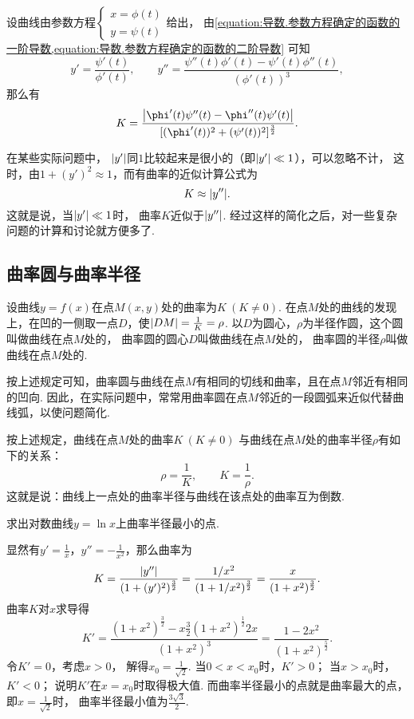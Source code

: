 设曲线由参数方程\(\left\{ \begin{array}{c}
	x = \phi(t) \\
	y = \psi(t)
\end{array} \right.\)给出，
由\cref{equation:导数.参数方程确定的函数的一阶导数,equation:导数.参数方程确定的函数的二阶导数}
可知\[
	y' = \frac{\psi'(t)}{\phi'(t)}, \qquad
	y'' = \frac{\psi''(t) \phi'(t) - \psi'(t) \phi''(t)}{(\phi'(t))^3},
\]
那么有\begin{equation}
	K = \frac{
		\abs{\phi'(t)\psi''(t)-\phi''(t)\psi'(t)}
	}{
		[(\phi'(t))^2+(\psi'(t))^2]^{\frac32}
	}.
\end{equation}

在某些实际问题中，
\(\abs{y'}\)同\(1\)比较起来是很小的（即\(\abs{y'} \ll 1\)），可以忽略不计，
这时，由\(1 + (y')^2 \approx 1\)，而有曲率的近似计算公式为\[
	K \approx \abs{y''}.
\]
这就是说，当\(\abs{y'} \ll 1\)时，
曲率\(K\)近似于\(\abs{y''}\).
经过这样的简化之后，对一些复杂问题的计算和讨论就方便多了.

\subsection{曲率圆与曲率半径}
设曲线\(y=f(x)\)在点\(M(x,y)\)处的曲率为\(K\ (K\neq0)\).
在点\(M\)处的曲线的发现上，在凹的一侧取一点\(D\)，使\(\abs{DM} = \frac{1}{K} = \rho\).
以\(D\)为圆心，\(\rho\)为半径作圆，这个圆叫做曲线在点\(M\)处的，
曲率圆的圆心\(D\)叫做曲线在点\(M\)处的，
曲率圆的半径\(\rho\)叫做曲线在点\(M\)处的.

按上述规定可知，曲率圆与曲线在点\(M\)有相同的切线和曲率，且在点\(M\)邻近有相同的凹向.
因此，在实际问题中，常常用曲率圆在点\(M\)邻近的一段圆弧来近似代替曲线弧，以使问题简化.

按上述规定，曲线在点\(M\)处的曲率\(K\ (K\neq0)\)
与曲线在点\(M\)处的曲率半径\(\rho\)有如下的关系：\[
	\rho = \frac{1}{K}, \qquad
	K = \frac{1}{\rho}.
\]
这就是说：曲线上一点处的曲率半径与曲线在该点处的曲率互为倒数.

\begin{example}
求出对数曲线\(y = \ln x\)上曲率半径最小的点.
\begin{solution}
显然有\(y' = \frac{1}{x}\)，\(y'' = -\frac{1}{x^2}\)，那么曲率为\[
	K = \frac{\abs{y''}}{(1+(y')^2)^{\frac32}}
	= \frac{1/x^2}{(1+1/x^2)^{\frac32}}
	= \frac{x}{(1+x^2)^{\frac32}}.
\]
曲率\(K\)对\(x\)求导得\[
	K' = \frac{(1+x^2)^{\frac32} - x \frac32 (1+x^2)^{\frac12} 2x}{(1+x^2)^3}
	= \frac{1 - 2x^2}{(1+x^2)^{\frac52}}.
\]
令\(K' = 0\)，考虑\(x>0\)，
解得\(x_0 = \frac{1}{\sqrt{2}}\).
当\(0<x<x_0\)时，\(K'>0\)；
当\(x>x_0\)时，\(K'<0\)；
说明\(K'\)在\(x=x_0\)时取得极大值.
而曲率半径最小的点就是曲率最大的点，
即\(x = \frac{1}{\sqrt{2}}\)时，
曲率半径最小值为\(\frac{3\sqrt{3}}{2}\).
\end{solution}
\end{example}

